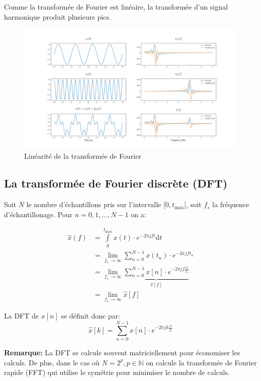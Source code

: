 \documentclass[]{article}
\begin{document}
Comme la transformée de Fourier est linéaire, la transformée d'un signal
harmonique produit plusieurs pics.

\begin{figure}
\centering
\includegraphics{../../figures/out/fourier_linearity.png}
\caption{Linéarité de la transformée de Fourier}
\end{figure}

\hypertarget{la-transformee-de-fourier-discrete-dft}{%
\subsection{La transformée de Fourier discrète
(DFT)}\label{la-transformee-de-fourier-discrete-dft}}

Soit \(N\) le nombre d'échantillons pris sur l'intervalle
\([0,t_{\text{max}}[\), soit \(f_s\) la fréquence d'échantillonage. Pour
\(n=0,1,\dots,N-1\) on a:

\begin{align*}
\hat{x}(f) &= \int\limits_{0}^{t_{\text{max}}} x(t)\cdot e^{-2\pi j ft}\mathrm{d}t \\
    &= \lim\limits_{f_s\rightarrow\infty} \sum\limits_{n=0}^{N-1} x(t_n)\cdot e^{-2\pi j ft_n}\\
    &= \lim\limits_{f_s\rightarrow\infty} \underbrace{\sum\limits_{n=0}^{N-1} x[n]\cdot e^{-2\pi j f \frac{n}{f_s}}}_{\hat{x}[f]}\\
    &= \lim\limits_{f_s\rightarrow\infty} \hat{x}[f]
\end{align*}

La DFT de \(x[n]\) se définit donc par:
\[ \hat{x}[k] = \sum\limits_{n=0}^{N-1} x[n]\cdot e^{-2\pi j k \frac{n}{f_s}} \]

\textbf{Remarque:} La DFT se calcule souvent matriciellement pour
économiser les calculs. De plus, dans le cas où \(N=2^p,p\in\mathbb{N}\)
on calcule la transformée de Fourier rapide (FFT) qui utilise le
symétrie pour minimiser le nombre de calculs.
\end{document}
